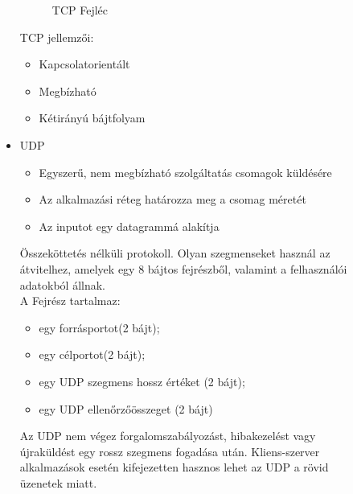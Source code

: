 \documentclass[margin=0px]{article}
\begin{document}
\begin{description}
\begin{itemize}
\begin{figure}[H]
								\caption{TCP Fejléc}
							\end{figure}
							TCP jellemzői:
							\begin{itemize}
								\item Kapcsolatorientált
								\item Megbízható
								\item Kétirányú bájtfolyam
							\end{itemize}
					\item UDP
						\begin{itemize}
							\item Egyszerű, nem megbízható szolgáltatás csomagok küldésére
							\item Az alkalmazási réteg határozza meg a csomag méretét
							\item Az inputot egy datagrammá alakítja	
						\end{itemize}
						Összeköttetés nélküli protokoll. Olyan szegmenseket használ az átvitelhez, amelyek egy 8 bájtos fejrészből, valamint a felhasználói adatokból állnak.\\
						A Fejrész tartalmaz:
						\begin{itemize}
							\item egy forrásportot(2 bájt);
							\item egy célportot(2 bájt);
							\item egy UDP szegmens hossz értéket (2 bájt);
							\item egy UDP ellenőrzőösszeget (2 bájt)		
						\end{itemize}
						Az UDP nem végez forgalomszabályozást, hibakezelést vagy újraküldést egy rossz szegmens fogadása után. Kliens-szerver alkalmazások esetén kifejezetten hasznos lehet az UDP a rövid üzenetek miatt.
				\end{itemize}
		\end{description}
\end{document}
